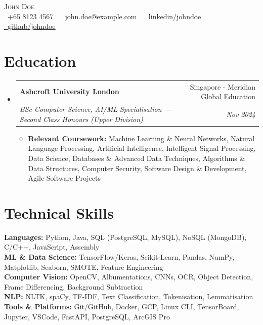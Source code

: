 \documentclass[letterpaper,10pt]{article}
\makeatletter
\newcommand{\resumeItem}[1]{\item\small{{#1\vspace{-3pt}}}}
\newcommand{\resumeSubheading}[4]{
  \vspace{-1pt}\item
    \begin{tabular*}{0.98\textwidth}[t]{l@{\extracolsep{\fill}}r}
      \textbf{#1} & #2 \\
      \textit{\small#3} & \textit{\small #4} \\
    \end{tabular*}\vspace{-5pt}
}
\newcommand{\resumeSubHeadingListStart}{\begin{itemize}[leftmargin=0.05in, rightmargin=0in, label={}]}
\newcommand{\resumeSubHeadingListEnd}{\end{itemize}}
\newcommand{\resumeItemListStart}{\begin{itemize}[leftmargin=0.15in, rightmargin=0.05in]\vspace{-2pt}}
\newcommand{\resumeItemListEnd}{\end{itemize}\vspace{-6pt}}
\makeatother
\begin{document}
\begin{center}
    {\huge \scshape John Doe} \\ \vspace{5.0pt}\small
 \raisebox{-0.1\height} \faPhone\ +65 8123 4567 ~
 \href{mailto:john.doe@example.com}
 {\raisebox{-0.1\height}\faEnvelopeO\  \underline{john.doe@example.com}} ~
\href{https://linkedin.com/in/johndoe/}{\raisebox{-0.1\height}\faLinkedinSquare\ \underline{linkedin/johndoe}} ~
\href{https://github.com/johndoe}{\raisebox{-0.1\height}\faGithub\ \underline{github/johndoe}} ~
\end{center}

\section{Education}
  \resumeSubHeadingListStart
    \resumeSubheading
      {Ashcroft University London}{Singapore - Meridian Global Education}
      {BSc Computer Science, AI/ML Specialisation \textnormal{---} Second Class Honours (Upper Division)}{Nov 2024}
      \resumeItemListStart
      \vspace{2pt}
        \resumeItem{\textbf{Relevant Coursework:} Machine Learning \& Neural Networks, Natural Language Processing, Artificial Intelligence, Intelligent Signal Processing, Data Science, Databases \& Advanced Data Techniques, Algorithms \& Data Structures, Computer Security, Software Design \& Development, Agile Software Projects}
      \resumeItemListEnd
  \resumeSubHeadingListEnd

\section{Technical Skills}
 \begin{itemize}[leftmargin=0.05in, label={}]
    \small{\item{
     \textbf{Languages:}{ Python, Java, SQL (PostgreSQL, MySQL), NoSQL (MongoDB), C/C++, JavaScript, Assembly} \\
     \textbf{ML \& Data Science:}{ TensorFlow/Keras, Scikit-Learn, Pandas, NumPy, Matplotlib, Seaborn, SMOTE, Feature Engineering} \\
     \textbf{Computer Vision:}{ OpenCV, Albumentations, CNNs, OCR, Object Detection, Frame Differencing, Background Subtraction} \\
     \textbf{NLP:}{ NLTK, spaCy, TF-IDF, Text Classification, Tokenisation, Lemmatisation} \\
     \textbf{Tools \& Platforms:}{ Git/GitHub, Docker, GCP, Linux CLI, TensorBoard, Jupyter, VSCode, FastAPI, PostgreSQL, ArcGIS Pro}}}
     \vspace{-4pt}
  \end{itemize}
\end{document}
